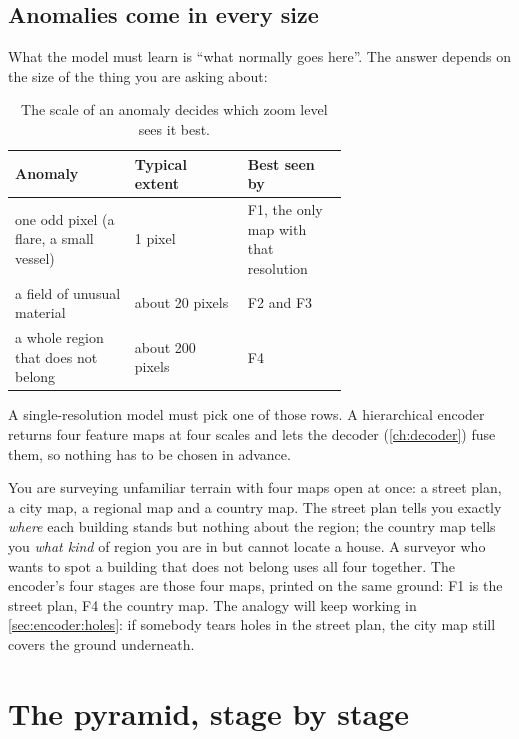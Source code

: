\subsection{Anomalies come in every size}

What the model must learn is ``what normally goes here''. The answer depends on the size of the thing
you are asking about:

\begin{table}[htbp]\centering
\caption{The scale of an anomaly decides which zoom level sees it best.}\label{tab:encoder:sizes}
\begin{tabular}{@{}p{0.36\linewidth}lp{0.3\linewidth}@{}}\toprule
Anomaly & Typical extent & Best seen by \\\midrule
one odd pixel (a flare, a small vessel) & 1 pixel & F1, the only map with that resolution \\
a field of unusual material & about 20 pixels & F2 and F3 \\
a whole region that does not belong & about 200 pixels & F4 \\\bottomrule
\end{tabular}
\end{table}

A single-resolution model must pick one of those rows. A hierarchical encoder returns four feature maps
at four scales and lets the decoder (\cref{ch:decoder}) fuse them, so nothing has to be chosen in
advance.

\begin{analogy}
You are surveying unfamiliar terrain with four maps open at once: a street plan, a city map, a regional
map and a country map. The street plan tells you exactly \emph{where} each building stands but nothing
about the region; the country map tells you \emph{what kind} of region you are in but cannot locate a
house. A surveyor who wants to spot a building that does not belong uses all four together. The
encoder's four stages are those four maps, printed on the same ground: F1 is the street plan, F4 the
country map. The analogy will keep working in \cref{sec:encoder:holes}: if somebody tears holes in the
street plan, the city map still covers the ground underneath.
\end{analogy}

\section{The pyramid, stage by stage}\label{sec:encoder:pyramid}

